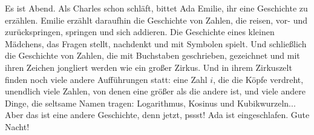 Es ist Abend. Als Charles schon schläft, bittet Ada Emilie, ihr eine Geschichte zu erzählen. Emilie erzählt daraufhin die Geschichte von Zahlen, die reisen, vor- und zurückspringen, springen und sich addieren. Die Geschichte eines kleinen Mädchens, das Fragen stellt, nachdenkt und mit Symbolen spielt. Und schließlich die Geschichte von Zahlen, die mit Buchstaben geschrieben, gezeichnet und mit ihren Zeichen jongliert werden wie ein großer Zirkus. Und in ihrem Zirkuszelt finden noch viele andere Aufführungen statt: eine Zahl $i$, die die Köpfe verdreht, unendlich viele Zahlen, von denen eine größer als die andere ist, und viele andere Dinge, die seltsame Namen tragen: Logarithmus, Kosinus und Kubikwurzeln...
Aber das ist eine andere Geschichte, denn jetzt, pssst! Ada ist eingeschlafen. Gute Nacht!

\vspace*{\fill}
